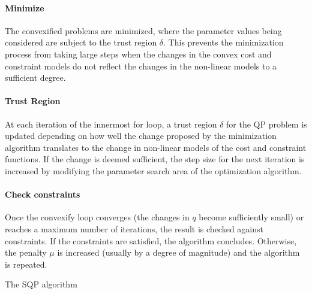 \documentclass[times, utf8, diplomski, english]{fer}
\begin{document}
\paragraph*{Minimize}
The convexified problems are minimized, where the parameter values being considered are subject to the trust region $\delta$.
This prevents the minimization process from taking large steps when the changes in the convex cost and constraint models do not reflect the changes in the non-linear models to a sufficient degree.
\paragraph*{Trust Region}
At each iteration of the innermost for loop, a trust region $\delta$ for the QP problem is updated depending on how well the change proposed by the minimization algorithm translates to the change in non-linear models of the cost and constraint functions.
If the change is deemed sufficient, the step size for the next iteration is increased by modifying the parameter search area of the optimization algorithm.
\paragraph*{Check constraints} 
Once the convexify loop converges (the changes in $q$ become sufficiently small) or reaches a maximum number of iterations, the result is checked against constraints.
If the constraints are satisfied, the algorithm concludes.
Otherwise, the penalty $\mu$ is increased (usually by a degree of magnitude) and the algorithm is repeated.

\begin{algorithm}[h]
 \caption{The SQP algorithm}
 \label{algorithm:sqp}
\end{algorithm}
\end{document}
